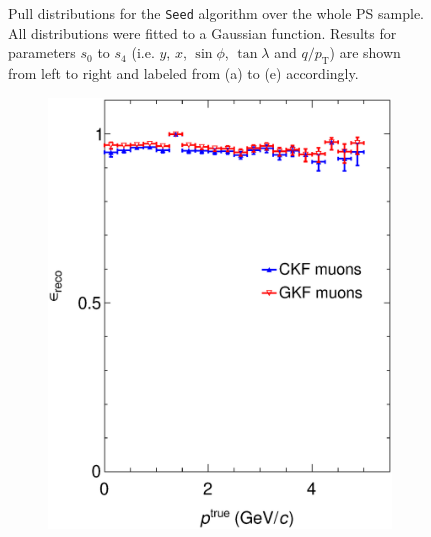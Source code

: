 \begin{figure}[t]
\begin{subfigure}{0.32\textwidth}
         \caption{}
         \label{fig:diff4_Integration}
     \end{subfigure}
        \caption{Pull distributions for the \texttt{Seed} algorithm over the whole PS sample. All distributions were fitted to a Gaussian function. Results for parameters $s_0$ to $s_4$ (i.e. $y$, $x$, $\sin\phi$, $\tan\lambda$ and $q/p_{\text{T}}$) are shown from left to right and labeled from (a) to (e) accordingly. }
        \label{fig:diff_Integration}
\end{figure}

\begin{figure}[t]
     \centering
     \begin{subfigure}{0.32\textwidth}
         \centering
         \includegraphics[width=\textwidth]{figures/ch5-KF_NDGAr/FullSample/Integration/EffVSp13.eps}
         \caption{}
         \label{fig:Eff13_Integration}
     \end{subfigure}
     \begin{subfigure}{0.32\textwidth}
         \centering

\end{subfigure}
\end{figure}

